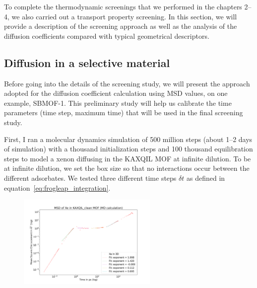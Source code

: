 \documentclass[main]{subfiles}
\begin{document}
To complete the thermodynamic screenings that we performed in the chapters 2--4, we also carried out a transport property screening. In this section, we will provide a description of the screening approach as well as the analysis of the diffusion coefficients compared with typical geometrical descriptors.

\subsection{Diffusion in a selective material}

Before going into the details of the screening study, we will present the approach adopted for the diffusion coefficient calculation using MSD values, on one example, SBMOF-1\autocite{Banerjee_2016}. This preliminary study will help us calibrate the time parameters (time step, maximum time) that will be used in the final screening study.

First, I ran a molecular dynamics simulation of 500 million steps (about 1--2 days of simulation) with a thousand initialization steps and 100 thousand equilibration steps to model a xenon diffusing in the KAXQIL\autocite{Banerjee2012} MOF at infinite dilution. To be at infinite dilution, we set the box size so that no interactions occur between the different adsorbates. We tested three different time steps $\delta t$ as defined in equation~\ref{eq:frogleap_integration}. 

\begin{figure}[ht]
  \centering
    \includegraphics[width=0.6\textwidth]{figures/5-diffusion/MSD_Xe_KAXQIL_clean.pdf}
    \caption{}\label{fgr:MSD_init}
\end{figure}
\end{document}
